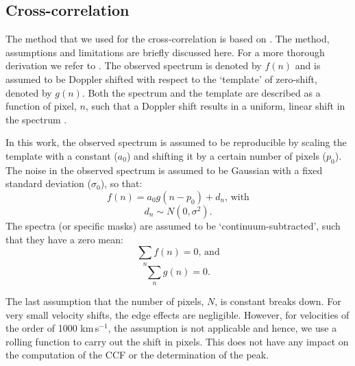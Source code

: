 \subsection{Cross-correlation}
The method that we used for the cross-correlation is based on \citet{zucker_cross-correlation_2003}. The method, assumptions and limitations are briefly discussed here. For a more thorough derivation we refer to \citet{zucker_cross-correlation_2003}. The observed spectrum is denoted by $f(n)$ and is assumed to be Doppler shifted with respect to the `template' of zero-shift, denoted by $g(n)$. Both the spectrum and the template are described as a function of pixel, $n$, such that a Doppler shift results in a uniform, linear shift in the spectrum \citep{tonry_survey_1979}.

In this work, the observed spectrum is assumed to be reproducible by scaling the template with a constant ($a_0$) and shifting it by a certain number of pixels ($p_0$). The noise in the observed spectrum is assumed to be Gaussian with a fixed standard deviation ($\sigma_0$), so that:
\begin{equation}
f(n) = a_0 g(n-p_0) + d_n \textrm{, with}
\end{equation}
\begin{equation}
d_n \sim N(0,\sigma^2) \textrm{.}
\end{equation}
The spectra (or specific masks) are assumed to be `continuum-subtracted', such that they have a zero mean:
\begin{equation}
\sum_n f(n) = 0 \textrm{, and}
\end{equation}
\begin{equation}
\sum_n g(n) = 0 \textrm{.}
\end{equation}

The last assumption that the number of pixels, $N$, is constant breaks down. For very small velocity shifts, the edge effects are negligible. However, for velocities of the order of 1000 km\,s$^{-1}$, the assumption is not applicable and hence, we use a rolling function to carry out the shift in pixels. This does not have any impact on the computation of the CCF or the determination of the peak.

